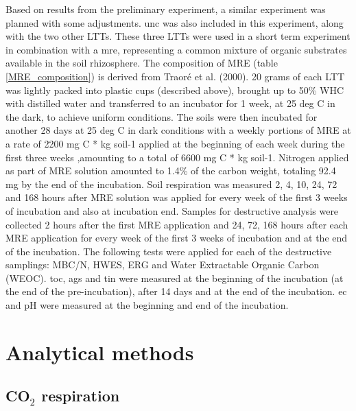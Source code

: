 	Based on results from the preliminary experiment, a similar experiment was planned with some adjustments. \gls{unc} was also included in this experiment, along with the two other LTTs.
	These three LTTs were used in a short term experiment in combination with a \gls{mre}, representing a common mixture of organic substrates available in the soil rhizosphere. The composition of MRE (table \ref{MRE_composition}) is derived from Traoré et al. (2000).
	20 grams of each LTT was lightly packed into plastic cups (described above), brought up to 50\% WHC with distilled water and transferred to an incubator for 1 week, at 25 deg C in the dark, to achieve uniform conditions. The soils were then incubated for another 28 days at 25 deg C in dark conditions with a weekly portions of MRE at a rate of 2200 mg C * kg soil-1  applied at the beginning of each week during the first three weeks ,amounting to a total of 6600 mg C * kg soil-1. Nitrogen applied as part of MRE solution amounted to 1.4\% of the carbon weight,  totaling 92.4 mg by the end of the incubation. Soil respiration was measured 2, 4, 10, 24, 72 and 168 hours after MRE solution was applied for every week of the first 3 weeks of incubation and also at incubation end. Samples for destructive analysis were collected 2 hours after the first MRE application and 24, 72, 168 hours after  each MRE application for every week of the first 3 weeks of incubation and at the end of the incubation. The following tests were applied for each of the destructive samplings: MBC/N, HWES, ERG and Water Extractable Organic Carbon (WEOC). \gls{toc}, \gls{ags} and \gls{tin} were measured at the beginning of the incubation (at the end of the pre-incubation), after 14 days and at the end of the incubation. \gls{ec} and pH were measured at the beginning and end of the incubation.


    

\section{Analytical methods}

    \subsection{CO$_2$ respiration}

